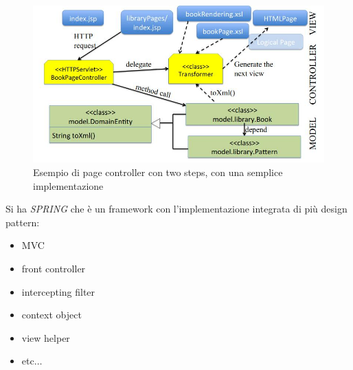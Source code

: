 \documentclass[a4paper,12pt, oneside]{book}
\begin{document}
\begin{itemize}
\begin{itemize}
  \end{itemize}
  \begin{figure}[H]
    \centering
    \includegraphics[scale = 0.4]{img/pgts.jpg}
    \caption{Esempio di page controller con two steps, con una semplice
      implementazione} 
    \label{fig:fc}
  \end{figure}
\end{itemize}
Si ha \textit{SPRING} che è un framework con l'implementazione integrata di più
design pattern:
\begin{itemize}
  \item MVC
  \item front controller
  \item intercepting filter
  \item context object
  \item view helper
  \item etc$\ldots$
\end{itemize}
\end{document}
